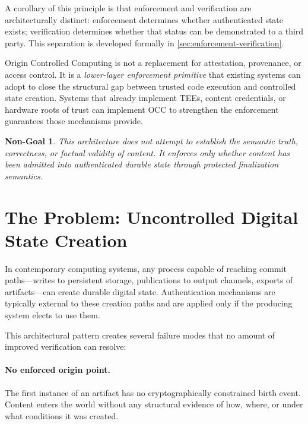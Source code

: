 \documentclass[11pt,letterpaper]{article}
\theoremstyle{occplain}
\theoremstyle{occremark}
\newtheorem{nongoal}{Non-Goal}[section]
\begin{document}
A corollary of this principle is that enforcement and verification are architecturally distinct: enforcement determines whether authenticated state exists; verification determines whether that status can be demonstrated to a third party. This separation is developed formally in \cref{sec:enforcement-verification}.

Origin Controlled Computing is not a replacement for attestation, provenance, or access control. It is a \emph{lower-layer enforcement primitive} that existing systems can adopt to close the structural gap between trusted code execution and controlled state creation. Systems that already implement TEEs, content credentials, or hardware roots of trust can implement OCC to strengthen the enforcement guarantees those mechanisms provide.

\begin{nongoal}
This architecture does not attempt to establish the semantic truth, correctness, or factual validity of content. It enforces only whether content has been admitted into authenticated durable state through protected finalization semantics.
\end{nongoal}


\section{The Problem: Uncontrolled Digital State Creation}
\label{sec:the-problem}

In contemporary computing systems, any process capable of reaching commit paths---writes to persistent storage, publications to output channels, exports of artifacts---can create durable digital state. Authentication mechanisms are typically external to these creation paths and are applied only if the producing system elects to use them.

This architectural pattern creates several failure modes that no amount of improved verification can resolve:

\paragraph{No enforced origin point.}
The first instance of an artifact has no cryptographically constrained birth event. Content enters the world without any structural evidence of how, where, or under what conditions it was created.
\end{document}
